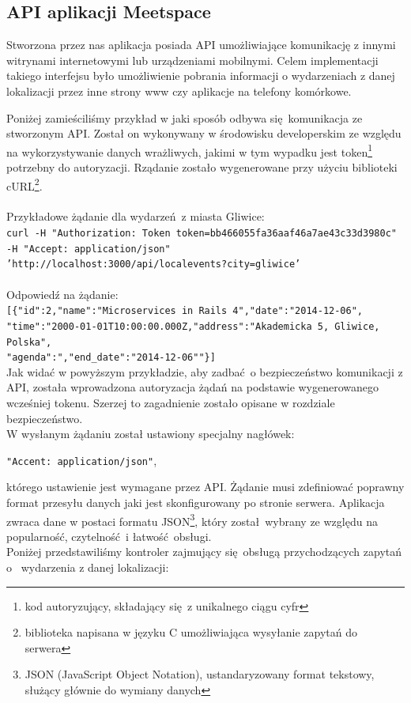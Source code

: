 \subsection{API aplikacji Meetspace}
  Stworzona przez nas aplikacja posiada API umożliwiające komunikację z innymi witrynami internetowymi lub urządzeniami mobilnymi. Celem implementacji takiego interfejsu było umożliwienie pobrania informacji o wydarzeniach z danej lokalizacji przez inne strony www czy aplikacje na telefony komórkowe.


  Poniżej zamieściliśmy przykład w jaki sposób odbywa się komunikacja ze stworzonym API. Został on wykonywany w środowisku developerskim ze względu na wykorzystywanie danych wrażliwych, jakimi w tym wypadku jest token\footnote{kod autoryzujący, składający się z unikalnego ciągu cyfr} potrzebny do autoryzacji. Rządanie zostało wygenerowane przy użyciu biblioteki cURL\footnote{biblioteka napisana w języku C umożliwiająca wysyłanie zapytań do serwera}.
  \\ \\
  Przykładowe żądanie dla wydarzeń z miasta Gliwice:\\
    \texttt{curl -H "Authorization: Token token=bb466055fa36aaf46a7ae43c33d3980c"
    -H "Accept: application/json"\\
    'http://localhost:3000/api/localevents?city=gliwice'}\\ \\
  Odpowiedź na żądanie:\\
    \texttt{[\{"id":2,"name":"Microservices in Rails 4","date":"2014-12-06",\\
    "time":"2000-01-01T10:00:00.000Z,"address":"Akademicka 5, Gliwice, Polska",\\
    "agenda":","end\_{}date":"2014-12-06""\}]}\\

  Jak widać w powyższym przykładzie, aby zadbać o bezpieczeństwo komunikacji z API, została wprowadzona autoryzacja żądań na podstawie wygenerowanego wcześniej tokenu. Szerzej to zagadnienie zostało opisane w rozdziale bezpieczeństwo.\\
  W wysłanym żądaniu został ustawiony specjalny nagłówek:
  \begin{center}
    \texttt{"Accent: application/json"},
  \end{center}
  którego ustawienie jest wymagane przez API. Żądanie musi zdefiniować poprawny format przesyłu danych jaki jest skonfigurowany po stronie serwera.
  Aplikacja zwraca dane w postaci formatu JSON\footnote{JSON (JavaScript Object Notation), ustandaryzowany format tekstowy, służący głównie do wymiany danych\cite{json}}, który został wybrany ze względu na popularność, czytelność i łatwość obsługi.\\
  Poniżej przedstawiliśmy kontroler zajmujący się obsługą przychodzących zapytań o~ wydarzenia z danej lokalizacji:\\

